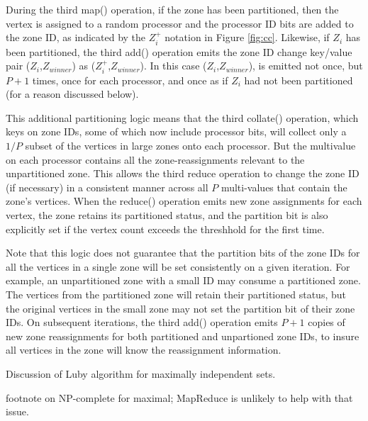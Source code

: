 During the third map() operation, if the zone has been partitioned,
then the vertex is assigned to a random processor and the processor ID
bits are added to the zone ID, as indicated by the $Z_i^+$ notation in
Figure \ref{fig:cc}.  Likewise, if $Z_i$ has been partitioned, the
third add() operation emits the zone ID change key/value pair
($Z_i$,$Z_{winner}$) as ($Z_i^+$,$Z_{winner}$).  In this case
($Z_i$,$Z_{winner}$), is emitted not once, but $P+1$ times, once for
each processor, and once as if $Z_i$ had not been partitioned (for a
reason discussed below).

This additional partitioning logic means that the third collate()
operation, which keys on zone IDs, some of which now include processor
bits, will collect only a $1/P$ subset of the vertices in large zones
onto each processor.  But the multivalue on each processor contains
all the zone-reassignments relevant to the unpartitioned zone.  This
allows the third reduce operation to change the zone ID (if necessary)
in a consistent manner across all $P$ multi-values that contain the
zone's vertices.  When the reduce() operation emits new zone
assignments for each vertex, the zone retains its partitioned status,
and the partition bit is also explicitly set if the vertex count
exceeds the threshhold for the first time.

Note that this logic does not guarantee that the partition bits of the
zone IDs for all the vertices in a single zone will be set
consistently on a given iteration.  For example, an unpartitioned zone
with a small ID may consume a partitioned zone.  The vertices from the
partitioned zone will retain their partitioned status, but the
original vertices in the small zone may not set the partition bit of
their zone IDs.  On subsequent iterations, the third add() operation
emits $P+1$ copies of new zone reassignments for both partitioned and
unpartioned zone IDs, to insure all vertices in the zone will know the
reassignment information.

Discussion of Luby algorithm for maximally independent sets.

footnote on NP-complete for maximal; MapReduce is unlikely to
help with that issue.

